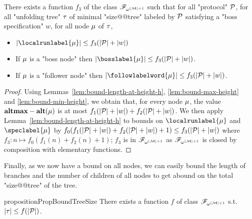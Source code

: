 \begin{lemma}
	\label{lem:bound-node-size}
	There exists a function $f_3$ of the class $\mathscr{F}_{\omega^{|\mathcal{M}|+1}}$ such that for all "protocol" $\mathcal{P}$, for all "unfolding tree" $\tau$ of minimal "size@@tree" labeled by $\mathcal{P}$ satisfying a "boss specification" $w$, for all node $\mu$ of $\tau$,
	
		\begin{itemize}
		\item $\size{\localrunlabel{\node}} \leq f_3(\size{\prot}+ \size{w})$
			
		\item If $\mu$ is a "boss node" then $\size{\bosslabel{\node}} \leq f_3(\size{\prot}+ \size{w})$.
		
		\item If $\mu$ is a "follower node" then $\size{\followlabelword{\node}} \leq f_3(\size{\prot}+ \size{w})$.
	\end{itemize} 
\end{lemma}
\begin{proof}
	Using Lemmas~\ref{lem:bound-length-at-height-h}, \ref{lem:bound-max-height} and \ref{lem:bound-min-height}, we obtain that, for every node $\mu$, the value $\mathbf{altmax} - \mathbf{alt}(\mu)$ is at most $f_1(|\mathcal{P}| + |w|) + f_2(|\mathcal{P}| + |w|)$. We then apply Lemma~\ref{lem:bound-length-at-height-h} to bounds on $\localrunlabel{\node}$ and $\speclabel{\node}$ by $f_0(f_1(|\mathcal{P}| + |w|) + f_2(|\mathcal{P}| + |w|)+1) \leq f_3(|\mathcal{P}| + |w|)$ where $f_3: n \mapsto f_0(f_1(n) + f_2(n)+1)$; $f_3$ is in $\mathscr{F}_{\omega^{|\mathcal{M}|+1}}$ as $\mathscr{F}_{\omega^{|\mathcal{M}|+1}}$ is closed by composition with elementary functions. 
\end{proof}

Finally, as we now have a bound on all nodes, we can easily bound the length of branches and the number of children of all nodes to get abound on the total "size@@tree" of the tree.

\begin{restatable}{proposition}{PropBoundTreeSize}
	\label{prop:bound-tree-size}
	There exists a function $f$ of class $\mathscr{F}_{\omega^{|\mathcal{M}|+1}}$ s.t. $|\tau| \leq f(|\mathcal{P}|)$.
\end{restatable}

